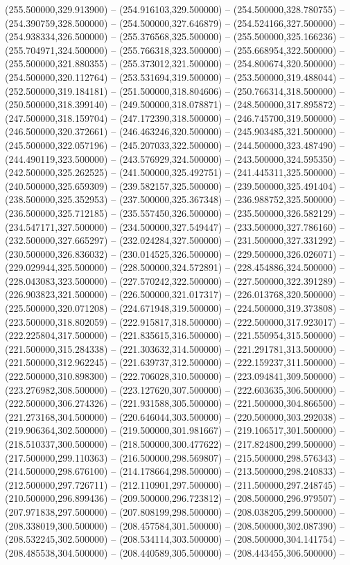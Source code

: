 (255.500000,329.913900) -- (254.916103,329.500000) -- (254.500000,328.780755) -- (254.390759,328.500000) -- (254.500000,327.646879) -- (254.524166,327.500000) -- (254.938334,326.500000) -- (255.376568,325.500000) -- (255.500000,325.166236) -- (255.704971,324.500000) -- (255.766318,323.500000) -- (255.668954,322.500000) -- (255.500000,321.880355) -- (255.373012,321.500000) -- (254.800674,320.500000) -- (254.500000,320.112764) -- (253.531694,319.500000) -- (253.500000,319.488044) -- (252.500000,319.184181) -- (251.500000,318.804606) -- (250.766314,318.500000) -- (250.500000,318.399140) -- (249.500000,318.078871) -- (248.500000,317.895872) -- (247.500000,318.159704) -- (247.172390,318.500000) -- (246.745700,319.500000) -- (246.500000,320.372661) -- (246.463246,320.500000) -- (245.903485,321.500000) -- (245.500000,322.057196) -- (245.207033,322.500000) -- (244.500000,323.487490) -- (244.490119,323.500000) -- (243.576929,324.500000) -- (243.500000,324.595350) -- (242.500000,325.262525) -- (241.500000,325.492751) -- (241.445311,325.500000) -- (240.500000,325.659309) -- (239.582157,325.500000) -- (239.500000,325.491404) -- (238.500000,325.352953) -- (237.500000,325.367348) -- (236.988752,325.500000) -- (236.500000,325.712185) -- (235.557450,326.500000) -- (235.500000,326.582129) -- (234.547171,327.500000) -- (234.500000,327.549447) -- (233.500000,327.786160) -- (232.500000,327.665297) -- (232.024284,327.500000) -- (231.500000,327.331292) -- (230.500000,326.836032) -- (230.014525,326.500000) -- (229.500000,326.026071) -- (229.029944,325.500000) -- (228.500000,324.572891) -- (228.454886,324.500000) -- (228.043083,323.500000) -- (227.570242,322.500000) -- (227.500000,322.391289) -- (226.903823,321.500000) -- (226.500000,321.017317) -- (226.013768,320.500000) -- (225.500000,320.071208) -- (224.671948,319.500000) -- (224.500000,319.373808) -- (223.500000,318.802059) -- (222.915817,318.500000) -- (222.500000,317.923017) -- (222.225804,317.500000) -- (221.835615,316.500000) -- (221.550954,315.500000) -- (221.500000,315.284338) -- (221.303632,314.500000) -- (221.291781,313.500000) -- (221.500000,312.962245) -- (221.639737,312.500000) -- (222.159237,311.500000) -- (222.500000,310.898300) -- (222.706028,310.500000) -- (223.094841,309.500000) -- (223.276982,308.500000) -- (223.127620,307.500000) -- (222.603635,306.500000) -- (222.500000,306.274326) -- (221.931588,305.500000) -- (221.500000,304.866500) -- (221.273168,304.500000) -- (220.646044,303.500000) -- (220.500000,303.292038) -- (219.906364,302.500000) -- (219.500000,301.981667) -- (219.106517,301.500000) -- (218.510337,300.500000) -- (218.500000,300.477622) -- (217.824800,299.500000) -- (217.500000,299.110363) -- (216.500000,298.569807) -- (215.500000,298.576343) -- (214.500000,298.676100) -- (214.178664,298.500000) -- (213.500000,298.240833) -- (212.500000,297.726711) -- (212.110901,297.500000) -- (211.500000,297.248745) -- (210.500000,296.899436) -- (209.500000,296.723812) -- (208.500000,296.979507) -- (207.971838,297.500000) -- (207.808199,298.500000) -- (208.038205,299.500000) -- (208.338019,300.500000) -- (208.457584,301.500000) -- (208.500000,302.087390) -- (208.532245,302.500000) -- (208.534114,303.500000) -- (208.500000,304.141754) -- (208.485538,304.500000) -- (208.440589,305.500000) -- (208.443455,306.500000) -- 